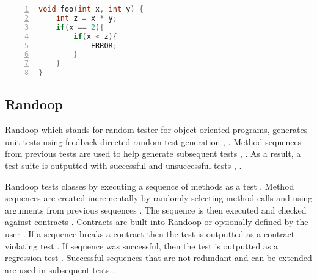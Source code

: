 
\begin{lstlisting}[language=C, tabsize=3, numbers=left,
label={lst:cuteExample}, caption={Example C program}]
void foo(int x, int y) {
	int z = x * y;
	if(x == 2){
		if(x < z){
			ERROR;
		}
	}
}
\end{lstlisting}

\subsection{Randoop}
Randoop which stands for random tester for object-oriented programs, generates unit tests using feedback-directed random test generation \cite{randoopAll}, \cite{randoopJava}. Method sequences from previous tests are used to help generate subsequent tests \cite{randoopAll}, \cite{randoopJava}.
As a result, a test suite is outputted with successful and unsuccessful tests \cite{randoopAll}, \cite{randoopJava}.

Randoop tests classes by executing a sequence of methods as a test \cite{randoopJava}. Method sequences are created incrementally by randomly selecting method calls and using arguments from previous sequences \cite{randoopJava}.
The sequence is then executed and checked against contracts \cite{randoopAll}.
Contracts are built into Randoop or optionally defined by the user \cite{randoopAll}.
If a sequence breaks a contract then the test is outputted as a contract-violating test \cite{randoopAll}. If sequence was successful, then the test is outputted as a regression test \cite{randoopAll}.
Successful sequences that are not redundant and can be extended are used in subsequent tests \cite{randoopAll}.


